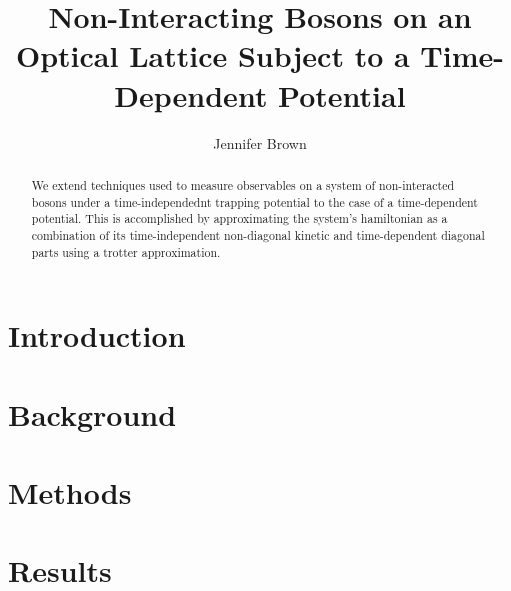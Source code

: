 \documentclass[a4paper,10pt]{article}
\title{Non-Interacting Bosons on an Optical Lattice Subject to a  Time-Dependent Potential}
\author{Jennifer Brown}
\begin{document}
\maketitle

\begin{abstract}
We extend techniques used to measure observables on a system of non-interacted bosons under a time-independednt trapping potential to the case of a time-dependent potential. 
This is accomplished by approximating the system's hamiltonian as a combination of its time-independent non-diagonal kinetic and time-dependent diagonal parts using a trotter approximation.
\end{abstract}

\section{Introduction}

\section{Background}

\section{Methods}

\section{Results}
\end{document}
